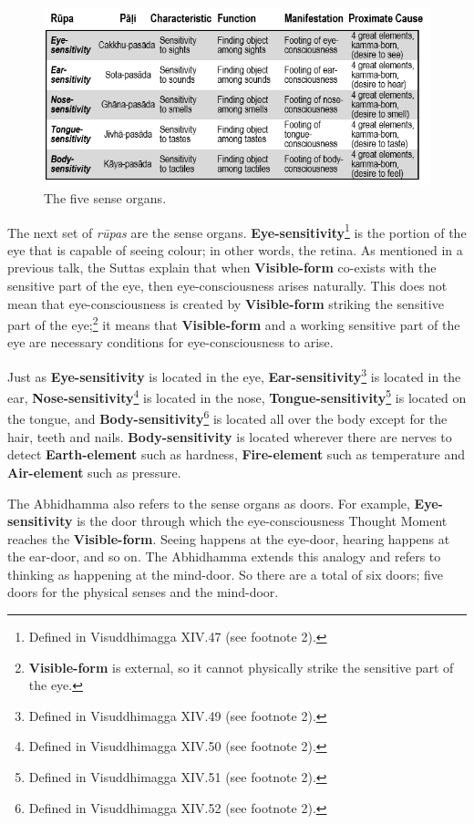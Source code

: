 \begin{figure}[h]
\centering
\includegraphics[width=0.8\linewidth]{./Diagrams/Organs}
\caption{The five sense organs.}
\label{fig:Organs}
\end{figure}

The next set of \textit{rūpas} are the sense organs. \textbf{Eye-sensitivity}\footnote{Defined in Visuddhimagga XIV.47 (see footnote 2).} is the portion of the eye that is capable of seeing colour; in other words, the retina. As mentioned in a previous talk, the Suttas explain that when \textbf{Visible-form} co-exists with the sensitive part of the eye, then eye-consciousness arises naturally. This does not mean that eye-consciousness is created by \textbf{Visible-form} striking the sensitive part of the eye;\footnote{\textbf{Visible-form} is external, so it cannot physically strike the sensitive part of the eye.} it means that \textbf{Visible-form} and a working sensitive part of the eye are necessary conditions for eye-consciousness to arise.

Just as \textbf{Eye-sensitivity} is located in the eye, \textbf{Ear-sensitivity}\footnote{Defined in Visuddhimagga XIV.49 (see footnote 2).} is located in the ear, \textbf{Nose-sensitivity}\footnote{Defined in Visuddhimagga XIV.50 (see footnote 2).} is located in the nose, \textbf{Tongue-sensitivity}\footnote{Defined in Visuddhimagga XIV.51 (see footnote 2).} is located on the tongue, and \textbf{Body-sensitivity}\footnote{Defined in Visuddhimagga XIV.52 (see footnote 2).} is located all over the body except for the hair, teeth and nails. \textbf{Body-sensitivity} is located wherever there are nerves to detect \textbf{Earth-element} such as hardness, \textbf{Fire-element} such as temperature and \textbf{Air-element} such as pressure.

The Abhidhamma also refers to the sense organs as doors. For example, \textbf{Eye-sensitivity} is the door through which the eye-consciousness Thought Moment reaches the \textbf{Visible-form}. Seeing happens at the eye-door, hearing happens at the ear-door, and so on. The Abhidhamma extends this analogy and refers to thinking as happening at the mind-door. So there are a total of six doors; five doors for the physical senses and the mind-door.

